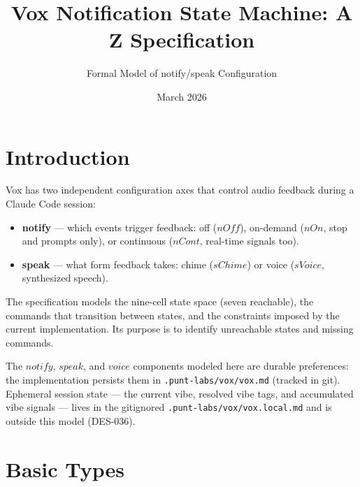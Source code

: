 \documentclass[a4paper,10pt,fleqn]{article}
\begin{document}
\title{Vox Notification State Machine: A Z Specification}
\author{Formal Model of notify/speak Configuration}
\date{March 2026}
\maketitle

\tableofcontents
\newpage

\section{Introduction}

Vox has two independent configuration axes that control audio
feedback during a Claude Code session:

\begin{itemize}
  \item \textbf{notify} --- which events trigger feedback:
    off ($nOff$), on-demand ($nOn$, stop and prompts only),
    or continuous ($nCont$, real-time signals too).
  \item \textbf{speak} --- what form feedback takes:
    chime ($sChime$) or voice ($sVoice$, synthesized speech).
\end{itemize}

The specification models the nine-cell state space (seven reachable), the commands
that transition between states, and the constraints imposed by
the current implementation. Its purpose is to identify
unreachable states and missing commands.

The $notify$, $speak$, and $voice$ components modeled here are
durable preferences: the implementation persists them in
\texttt{.punt-labs/vox/vox.md} (tracked in git). Ephemeral session
state --- the current vibe, resolved vibe tags, and accumulated vibe
signals --- lives in the gitignored \texttt{.punt-labs/vox/vox.local.md}
and is outside this model (DES-036).

\section{Basic Types}
\end{document}
